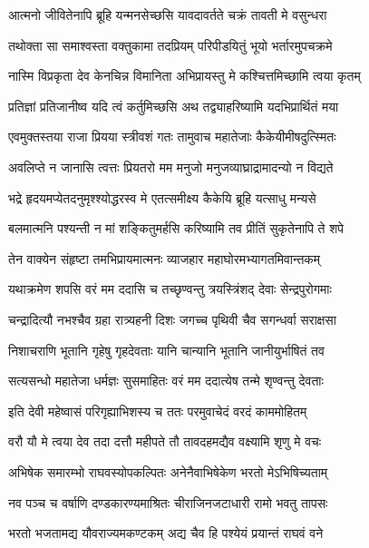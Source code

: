 \twolineshloka
{आत्मनो जीवितेनापि ब्रूहि यन्मनसेच्छसि}
{यावदावर्तते चक्रं तावती मे वसुन्धरा} %

\twolineshloka
{तथोक्ता सा समाश्वस्ता वक्तुकामा तदप्रियम्}
{परिपीडयितुं भूयो भर्तारमुपचक्रमे} %

\twolineshloka
{नास्मि विप्रकृता देव केनचिन्न विमानिता}
{अभिप्रायस्तु मे कश्चित्तमिच्छामि त्वया कृतम्} %

\twolineshloka
{प्रतिज्ञां प्रतिजानीष्व यदि त्वं कर्तुमिच्छसि}
{अथ तद्व्याहरिष्यामि यदभिप्रार्थितं मया} %

\twolineshloka
{एवमुक्तस्तया राजा प्रियया स्त्रीवशं गतः}
{तामुवाच महातेजाः कैकेयीमीषदुत्स्मितः} %

\twolineshloka
{अवलिप्ते न जानासि त्वत्तः प्रियतरो मम}
{मनुजो मनुजव्याघ्राद्रामादन्यो न विद्यते} %

\twolineshloka
{भद्रे हृदयमप्येतदनुमृश्श्योद्धरस्व मे}
{एतत्समीक्ष्य कैकेयि ब्रूहि यत्साधु मन्यसे} %

\twolineshloka
{बलमात्मनि पश्यन्ती न मां शङ्कितुमर्हसि}
{करिष्यामि तव प्रीतिं सुकृतेनापि ते शपे} %

\twolineshloka
{तेन वाक्येन संहृष्टा तमभिप्रायमात्मनः}
{व्याजहार महाघोरमभ्यागतमिवान्तकम्} %

\twolineshloka
{यथाक्रमेण शपसि वरं मम ददासि च}
{तच्छृण्वन्तु त्रयस्त्रिंशद् देवाः सेन्द्रपुरोगमाः} %

\twolineshloka
{चन्द्रादित्यौ नभश्चैव ग्रहा रात्र्यहनी दिशः}
{जगच्च पृथिवी चैव सगन्धर्वा सराक्षसा} %

\twolineshloka
{निशाचराणि भूतानि गृहेषु गृहदेवताः}
{यानि चान्यानि भूतानि जानीयुर्भाषितं तव} %

\twolineshloka
{सत्यसन्धो महातेजा धर्मज्ञः सुसमाहितः}
{वरं मम ददात्येष तन्मे शृण्वन्तु देवताः} %

\twolineshloka
{इति देवी महेष्वासं परिगृह्याभिशस्य च}
{ततः परमुवाचेदं वरदं काममोहितम्} %

\twolineshloka
{वरौ यौ मे त्वया देव तदा दत्तौ महीपते}
{तौ तावदहमद्यैव वक्ष्यामि शृणु मे वचः} %

\twolineshloka
{अभिषेक समारम्भो राघवस्योपकल्पितः}
{अनेनैवाभिषेकेण भरतो मेऽभिषिच्यताम्} %

\twolineshloka
{नव पञ्च च वर्षाणि दण्डकारण्यमाश्रितः}
{चीराजिनजटाधारी रामो भवतु तापसः} %

\twolineshloka
{भरतो भजतामद्य यौवराज्यमकण्टकम्}
{अद्य चैव हि पश्येयं प्रयान्तं राघवं वने} %

